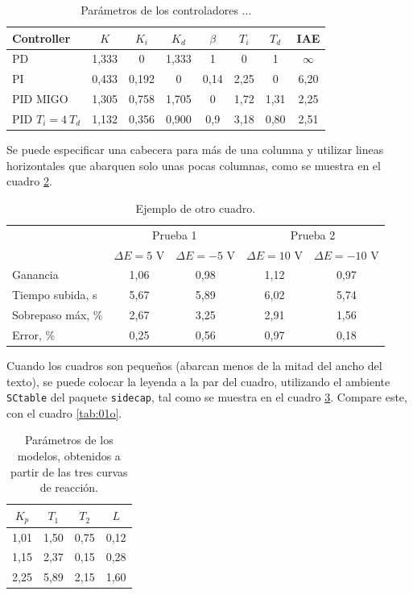 \begin{table}
\caption{Parámetros de los controladores ...} \label{tab:AH}
\begin{center}
    \begin{tabular}{@{}l*{7}{c}@{}}
    \toprule
    Controller & $K$ & $K_i$ & $K_d$ & $\beta$ & $T_i$ & $T_d$ & IAE \\
    \midrule
    PD &  1,333 & 0 & 1,333 & 1 & 0 &1 & $\infty$ \\
		PI & 0,433 & 0,192 & 0 & 0,14 & 2,25 & 0 & 6,20 \\
		PID MIGO & 1,305 & 0,758 & 1,705 & 0 & 1,72 & 1,31 & 2,25 \\
		PID $T_i=4 \ T_d$ & 1,132 & 0,356 & 0,900 & 0,9 & 3,18 & 0,80 & 2,51 \\
    \bottomrule
    \end{tabular}
\end{center}
\end{table}

Se puede especificar una cabecera para más de una columna y utilizar lineas horizontales que abarquen solo unas pocas columnas, como se muestra en el cuadro \ref{tab:muestra}.

\begin{table}
\caption{Ejemplo de otro cuadro.} \label{tab:muestra}
	\begin{tabular}{@{}l*{4}{c}@{}}
	\toprule
	& \multicolumn{2}{c}{Prueba 1} & \multicolumn{2}{c}{Prueba 2} \\
	\cmidrule(l{2pt}r{2pt}){2-3}\cmidrule(l{2pt}r{2pt}){4-5} 
	& $\Delta E=5$ V & $\Delta E = -5$ V & $\Delta E = 10$ V & $\Delta E = -10$ V \\
	\midrule
	Ganancia             &  1,06 & 0,98 & 1,12 & 0,97 \\
	Tiempo subida, s  &  5,67 & 5,89 & 6,02 & 5,74 \\
	Sobrepaso máx, \%        &  2,67 & 3,25 & 2,91 & 1,56 \\
	Error, \% &  0,25 & 0,56 & 0,97 & 0,18 \\
	\bottomrule
	\end{tabular}
\end{table}

\newpage
Cuando los cuadros son pequeños (abarcan menos de la mitad del ancho del texto), se puede colocar la leyenda a la par del cuadro, utilizando el ambiente \texttt{SCtable} del paquete \texttt{sidecap}, tal como se muestra en el cuadro \ref{tab:01}.  Compare este, con el cuadro \ref{tab:01o}.

\begin{table}
\caption[Parámetros de los modelos]{Parámetros de los modelos, obtenidos a partir de las tres curvas de reacción.} \label{tab:01}
    \begin{tabular}{@{}*{4}{c}@{}}
    \toprule
    $K_p$ & $T_1$ & $T_2$ & $L$ \\
    \midrule
     1,01 & 1,50 & 0,75 & 0,12 \\
		 1,15 & 2,37 & 0,15 & 0,28 \\
		 2,25 & 5,89 & 2,15 & 1,60 \\
    \bottomrule
    \end{tabular}
\end{table}
